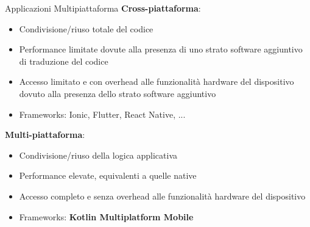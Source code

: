 \begin{frame}{Applicazioni Multipiattaforma}
    \textbf{Cross-piattaforma}:
    \begin{itemize}
        \item Condivisione/riuso totale del codice
        \item Performance limitate dovute alla presenza di uno strato software aggiuntivo di traduzione del codice
        \item Accesso limitato e con overhead alle funzionalità hardware del dispositivo dovuto alla presenza dello strato software aggiuntivo
        \item Frameworks: Ionic, Flutter, React Native, ...
    \end{itemize}
    \vspace{5mm}
    \textbf{Multi-piattaforma}:
    \begin{itemize}
        \item Condivisione/riuso della logica applicativa
        \item Performance elevate, equivalenti a quelle native
        \item Accesso completo e senza overhead alle funzionalità hardware del dispositivo
        \item Frameworks: \textbf{Kotlin Multiplatform Mobile}
    \end{itemize}
\end{frame}

